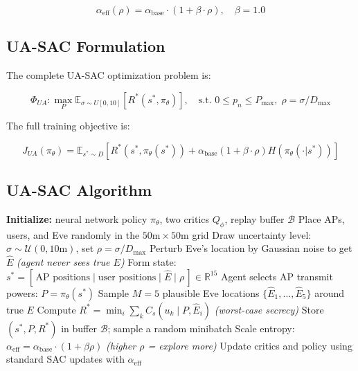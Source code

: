 \documentclass[conference]{IEEEtran}
\newcommand{\aeff}{\alpha_{\text{eff}}}
\newcommand{\abase}{\alpha_{\text{base}}}
\newcommand{\Rstar}{R^*}
\begin{document}
\begin{equation}
\alpha_{\text{eff}}(\rho)=
\alpha_{\text{base}}
\cdot
(1+\beta\cdot\rho),
\quad
\beta=1.0
\end{equation}

\subsection{UA-SAC Formulation}

The complete UA-SAC optimization problem is:

\begin{equation}
\Phi_{UA}:
\max_P
\mathbb{E}_{\sigma\sim U[0,10]}
[R^*(s^*,\pi_\theta)],
\quad
\text{s.t. }
0\leq p_n\leq P_{\max},
\;
\rho=\sigma/D_{\max}
\end{equation}

The full training objective is:

\begin{equation}
J_{UA}(\pi_\theta)=
\mathbb{E}_{s^*\sim D}
\left[
R^*(s^*,\pi_\theta(s^*))
+
\alpha_{\text{base}}
(1+\beta\cdot\rho)
H(\pi_\theta(\cdot|s^*))
\right]
\end{equation}

\subsection{UA-SAC Algorithm}

\begin{algorithm}[H]
\caption{UA-SAC: Uncertainty-Aware Soft Actor-Critic}
\begin{algorithmic}[1]
\STATE \textbf{Initialize:} neural network policy $\pi_\theta$, two critics $Q_\phi$, replay buffer $\mathcal{B}$
    \STATE Place APs, users, and Eve randomly in the $50\text{m} \times 50\text{m}$ grid
    \STATE Draw uncertainty level: $\sigma \sim \mathcal{U}(0, 10\text{m})$, set $\rho = \sigma / D_{\max}$
    \STATE Perturb Eve's location by Gaussian noise to get $\hat{E}$ \hfill \textit{(agent never sees true $E$)}
    \STATE Form state: $s^* = [\,\text{AP positions} \mid \text{user positions} \mid \hat{E} \mid \rho\,] \in \mathbb{R}^{15}$
    \STATE Agent selects AP transmit powers: $P = \pi_\theta(s^*)$
    \STATE Sample $M=5$ plausible Eve locations $\{\hat{E}_1,\ldots,\hat{E}_5\}$ around true $E$
    \STATE Compute $\Rstar = \min_i \sum_k C_s(u_k \mid P, \hat{E}_i)$ \hfill \textit{(worst-case secrecy)}
    \STATE Store $(s^*, P, \Rstar)$ in buffer $\mathcal{B}$; sample a random minibatch
    \STATE Scale entropy: $\aeff = \abase \cdot (1 + \beta\rho)$ \hfill \textit{(higher $\rho$ = explore more)}
    \STATE Update critics and policy using standard SAC updates with $\aeff$
\ENDFOR
\end{algorithmic}
\end{algorithm}
\end{document}
